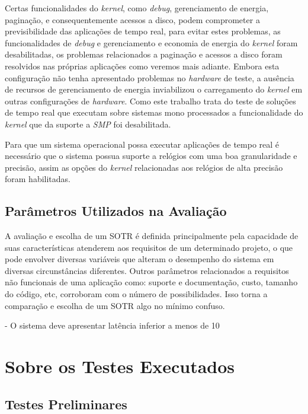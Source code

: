 Certas funcionalidades do \textit{kernel}, como \textit{debug}, gerenciamento de energia, paginação, e consequentemente acessos a disco, podem comprometer a previsibilidade das aplicações de tempo real, para evitar estes problemas, as funcionalidades de \textit{debug} e gerenciamento e economia de energia do \textit{kernel} foram desabilitadas, os problemas relacionados a paginação e acessos a disco foram resolvidos nas próprias aplicações como veremos mais adiante. Embora esta configuração não tenha apresentado problemas no \textit{hardware} de teste, a ausência de recursos de gerenciamento de energia inviabilizou o carregamento do \textit{kernel} em outras configurações de \textit{hardware}. Como este trabalho trata do teste de soluções de tempo real que executam sobre sistemas mono processados a funcionalidade do \textit{kernel} que da suporte a \textit{SMP} foi desabilitada.
		
Para que um sistema operacional possa executar aplicações de tempo real é necessário que o sistema possua suporte a relógios com uma boa granularidade e precisão, assim as opções do \textit{kernel} relacionadas aos relógios de alta precisão foram habilitadas.
	
\subsection{Parâmetros Utilizados na Avaliação}

A avaliação e escolha de um SOTR é definida principalmente pela capacidade de suas características atenderem aos requisitos de um determinado projeto, o que pode envolver diversas variáveis que alteram o desempenho do sistema em diversas circunstâncias diferentes. Outros parâmetros relacionados a requisitos não funcionais de uma aplicação como: suporte e documentação, custo, tamanho do código, etc, corroboram com o número de possibilidades. Isso torna a comparação e escolha de um SOTR algo no mínimo confuso.

- O sistema deve apresentar latência inferior a menos de 10%

\section{Sobre os Testes Executados}

\subsection{Testes Preliminares}

